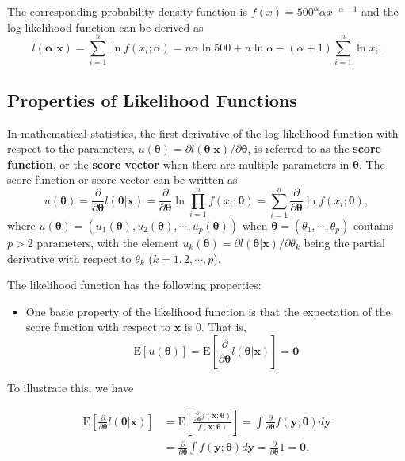 \documentclass[]{book}
\providecommand{\tightlist}{%
  \setlength{\itemsep}{0pt}\setlength{\parskip}{0pt}}
\theoremstyle{definition}
\theoremstyle{definition}
\theoremstyle{definition}
\theoremstyle{remark}
\begin{document}
The corresponding probability density function is
\(f(x) = 500^{\alpha} \alpha x^{-\alpha-1}\) and the log-likelihood
function can be derived as
\[l(\boldsymbol \alpha|\mathbf{x}) = \sum_{i=1}^n \ln f(x_i;\alpha) = n \alpha \ln 500 +n \ln \alpha -(\alpha+1)  \sum_{i=1}^n \ln x_i .\]

\subsection{Properties of Likelihood
Functions}\label{properties-of-likelihood-functions}

In mathematical statistics, the first derivative of the log-likelihood
function with respect to the parameters,
\(u(\boldsymbol\theta)=\partial l(\boldsymbol \theta|\mathbf{x})/\partial \boldsymbol \theta\),
is referred to as the \textbf{score function}, or the \textbf{score
vector} when there are multiple parameters in \(\boldsymbol\theta\). The
score function or score vector can be written as
\[u(\boldsymbol\theta)=\frac{ \partial}{\partial \boldsymbol \theta} l(\boldsymbol \theta|\mathbf{x})
    =\frac{ \partial}{\partial \boldsymbol \theta} \ln \prod_{i=1}^n
    f(x_i;\boldsymbol \theta ) =\sum_{i=1}^n \frac{
    \partial}{\partial \boldsymbol \theta}
    \ln f(x_i;\boldsymbol \theta ),\] where
\(u(\boldsymbol\theta)=(u_1(\boldsymbol\theta),u_2(\boldsymbol\theta),\cdots,u_p(\boldsymbol\theta))\)
when \(\boldsymbol\theta=(\theta_1,\cdots,\theta_p)\) contains \(p>2\)
parameters, with the element
\(u_k(\boldsymbol\theta)=\partial l(\boldsymbol \theta|\mathbf{x})/\partial \theta_k\)
being the partial derivative with respect to \(\theta_k\)
(\(k=1,2,\cdots,p\)).

The likelihood function has the following properties:

\begin{itemize}
\tightlist
\item
  One basic property of the likelihood function is that the expectation
  of the score function with respect to \(\mathbf{x}\) is 0. That is,
  \[\mathrm{E}[u(\boldsymbol\theta)]=\mathrm{E} \left[ \frac{ \partial}{\partial \boldsymbol \theta}
  l(\boldsymbol \theta|\mathbf{x}) \right] = \mathbf 0\]
\end{itemize}

To illustrate this, we have

\[\begin{aligned}
    \mathrm{E} \left[ \frac{ \partial}{\partial \boldsymbol \theta} l(\boldsymbol \theta|\mathbf{x}) \right]
    &= \mathrm{E} \left[ \frac{\frac{\partial}{\partial \boldsymbol \theta}f(\mathbf{x};\boldsymbol \theta)}{f(\mathbf{x};\boldsymbol \theta )}  \right]
    = \int\frac{\partial}{\partial \boldsymbol \theta} f(\mathbf{y};\boldsymbol \theta ) d \mathbf y \\
    &= \frac{\partial}{\partial \boldsymbol \theta} \int f(\mathbf{y};\boldsymbol \theta ) d \mathbf y
    = \frac{\partial}{\partial \boldsymbol \theta} 1 = \mathbf 0.\end{aligned}\]
\end{document}
